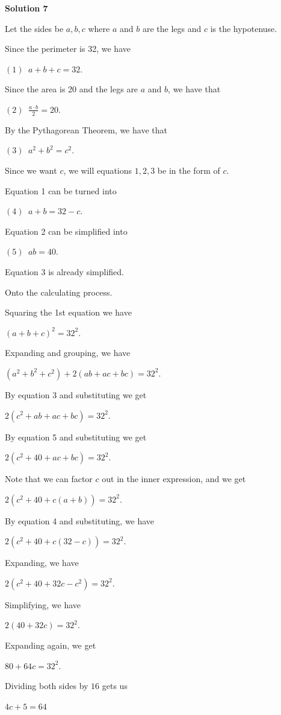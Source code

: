 \begin{enumerate}
\textbf{Solution 7}

Let the sides be $a, b, c$ where $a$ and $b$ are the legs and $c$ is the hypotenuse.

 Since the perimeter is 32, we have

 $(1) \phantom{a} a+b+c=32$.

 Since the area is 20 and the legs are $a$ and $b$, we have that

 $(2) \phantom{a} \frac{a \cdot b}{2}=20$.

 By the Pythagorean Theorem, we have that

 $(3) \phantom{a} a^2+b^2=c^2$.

 Since we want $c$, we will equations $1, 2, 3$ be in the form of $c.$

 Equation 1 can be turned into

 $(4) \phantom{a} a+b=32-c$.

 Equation 2 can be simplified into

 $(5) \phantom{a} ab=40.$

 Equation 3 is already simplified.

 Onto the calculating process.

 Squaring the 1st equation we have

 $(a+b+c)^2=32^2.$

 Expanding and grouping, we have

 $(a^2+b^2+c^2)+2(ab+ac+bc)=32^2.$

 By equation 3 and substituting we get

 $2(c^2+ab+ac+bc)=32^2.$

 By equation 5 and substituting we get

 $2(c^2+40+ac+bc)=32^2.$

 Note that we can factor $c$ out in the inner expression, and we get

 $2(c^2+40+c(a+b))=32^2.$

 By equation 4 and substituting, we have

 $2(c^2+40+c(32-c))=32^2.$

 Expanding, we have

 $2(c^2+40+32c-c^2)=32^2.$

 Simplifying, we have

 $2(40+32c)=32^2.$

 Expanding again, we get

 $80+64c=32^2.$

 Dividing both sides by $16$ gets us

 $4c+5=64$


\end{enumerate}
